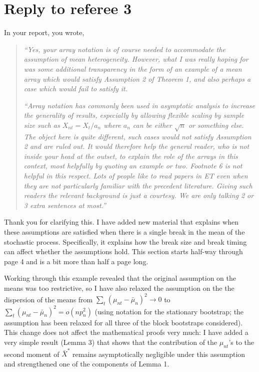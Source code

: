 \documentclass[12pt]{article}
\begin{document}
\section*{\hfill Reply to referee 3\hfill}

In your report, you wrote,
\begin{quotation}
  \noindent\textit{``Yes, your array notation is of course needed to
    accommodate the assumption of mean heterogeneity. However, what I
    was really hoping for was some additional transparency in the form
    of an example of a mean array which would satisfy Assumption 2 of
    Theorem 1, and also perhaps a case which would fail to satisfy
    it.}

  \textit{``Array notation has commonly been used in asymptotic
    analysis to increase the generality of results, especially by
    allowing flexible scaling by sample size such as
    $X_{nt} = X_t/a_n$ where $a_n$ can be either $\sqrt{n}$ or
    something else. The object here is quite different, such cases
    would not satisfy Assumption 2 and are ruled out. It would
    therefore help the general reader, who is not inside your head at
    the outset, to explain the role of the arrays in this context,
    most helpfully by quoting an example or two. Footnote 6 is not
    helpful in this respect. Lots of people like to read papers in ET
    even when they are not particularly familiar with the precedent
    literature. Giving such readers the relevant background is just a
    courtesy. We are only talking 2 or 3 extra sentences at most.''}
\end{quotation}

Thank you for clarifying this. I have added new material that explains
when these assumptions are satisfied when there is a single break in
the mean of the stochastic process. Specifically, it explains how the
break size and break timing can affect whether the assumptions
hold. This section starts half-way through page 4 and is a bit more
than half a page long.

Working through this example revealed that the original assumption
on the means was too restrictive, so I have also relaxed the
assumption on the the dispersion of the means from
$\sum_t (\mu_{nt} - \bar \mu_n)^2 \to 0$ to
$\sum_t (\mu_{nt} - \bar \mu_n)^2 = o(n p_n^2)$ (using notation for
the stationary bootstrap; the assumption has been relaxed for all
three of the block bootstraps considered).  This change does not
affect the mathematical proofs very much: I have added a very simple
result (Lemma 3) that shows that the contribution of the $\mu_{nt}$'s to the
second moment of $\bar X^*$ remains asymptotically negligible under
this assumption and strengthened one of the components of Lemma 1.
\end{document}
